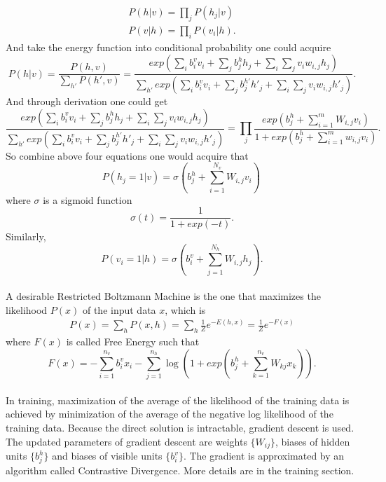 \documentclass[12pt]{article}
\begin{document}
\begin{gather}
P(h|v)=\prod_j P(h_j|v)\\
P(v|h)=\prod_i P(v_i|h).
\end{gather}
And take the energy function into conditional probability one could acquire \begin{equation}
P(h|v)=\frac{P(h,v)}{\sum_{h'} P(h',v)}=\frac{exp(\sum_i b^v_i v_i + \sum_j b^h_j h_j +\sum_i \sum_j v_i w_{i,j} h_j)}{\sum_{h'} exp(\sum_i b^v_i v_i + \sum_j b^{h'}_j h'_j +\sum_i \sum_j v_i w_{i,j} h'_j)}.
\end{equation}
And through derivation one could get\begin{equation}
\frac{exp(\sum_i b^v_i v_i + \sum_j b^h_j h_j +\sum_i \sum_j v_i w_{i,j} h_j)}{\sum_{h'} exp(\sum_i b^v_i v_i + \sum_j b^{h'}_j h'_j +\sum_i \sum_j v_i w_{i,j} h'_j)}=\prod_{j}\frac{exp(b^h_j + \sum_{i=1}^m W_{i,j} v_i )}{1+exp(b^h_j + \sum_{i=1}^m w_{i,j} v_i )}.
\end{equation}
So combine above four equations one would acquire that
\begin{equation}
P(h_j=1|v) = \sigma \left(b^h_j + \sum_{i=1}^{N_v} W_{i,j} v_i \right)\,
\end{equation}
where $\sigma$ is a sigmoid function\begin{equation}
\sigma(t) = \frac{1} {1 + exp(-t)}.
\end{equation}
Similarly,
\begin{equation}
P(v_i=1|h) = \sigma \left(b^v_i + \sum_{j=1}^{N_h} W_{i,j} h_j \right).
\end{equation}
\\
A desirable Restricted Boltzmann Machine is the one that maximizes the likelihood $P(x)$ of the input data $x$, which is\begin{align}
P(x) = \sum_h P(x,h) = \sum_h \frac{1}{Z}e^{-E(h, x)}=\frac{1}{Z}e^{-F(x)}
\end{align}
where $F(x)$ is called Free Energy such that \begin{equation}
F(x) = - \sum_{i=1}^{n_v} b^v_ix_i-\sum_{j=1}^{n_h}\log(1+ exp(b^h_j+\sum_{k=1}^{n_v} W_{kj}x_k)).
\end{equation}
\\
In training, maximization of the average of the likelihood of the training data is achieved by minimization of the average of the negative log likelihood of the training data. Because the direct solution is intractable, gradient descent is used. The updated parameters of gradient descent are weights $\{W_{ij}\}$, biases of hidden units $\{b^h_j\}$ and biases of visible units $\{b^v_i\}$. The gradient is approximated by an algorithm called Contrastive Divergence. More details are in the training section.\\
\end{document}

